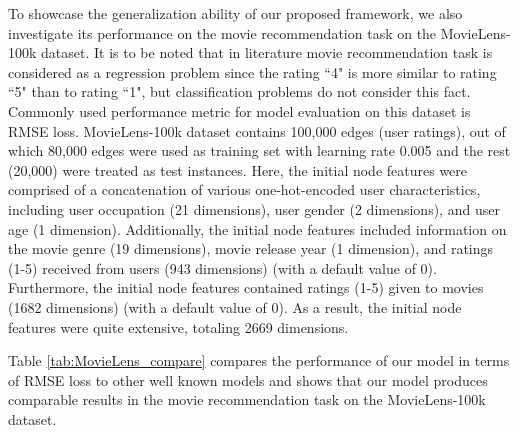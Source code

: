  

To showcase the generalization ability of our proposed framework, we also investigate its performance on the movie recommendation task on the MovieLens-100k dataset. It is to be noted that in literature  movie recommendation task is considered as a regression problem since the rating ``4" is more similar to rating ``5" than to rating ``1", but classification problems do not consider this fact. Commonly used performance metric for model evaluation on this
dataset is RMSE loss. MovieLens-100k dataset contains 100,000 edges (user ratings), out of which 80,000 edges were used as training set with learning rate 0.005
and the rest (20,000) were treated as test instances. Here, the initial node features were comprised of a concatenation of various one-hot-encoded user characteristics, including user occupation (21 dimensions), user gender (2 dimensions), and user age (1 dimension). Additionally, the initial node features included information on the movie genre (19 dimensions), movie release year (1 dimension), and ratings (1-5) received from users (943 dimensions) (with a default value of 0). Furthermore, the initial node features contained ratings (1-5) given to movies (1682 dimensions) (with a default value of 0). As a result, the initial node features were quite extensive, totaling 2669 dimensions. 

Table \ref{tab:MovieLens_compare} compares the performance of our model in terms of RMSE loss to other well known models and shows that our model produces comparable results in the movie recommendation task on the MovieLens-100k dataset.
